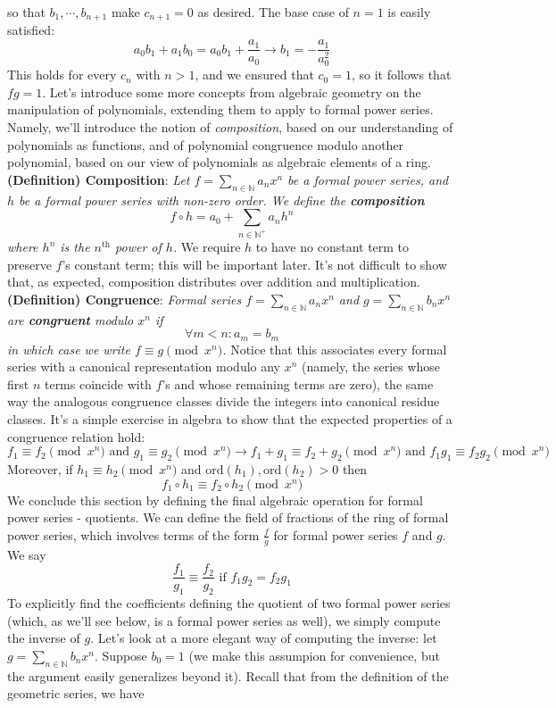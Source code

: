 \documentclass{article}
\newcommand*{\tb}{\textbf}
\newcommand*{\ti}{\textit}
\newcommand*{\nn}{\newline \newline}
\newcommand*{\N}{\mathbb{N}}
\begin{document}
so that $ b_1, \cdots, b_{n + 1} $ make $ c_{n + 1} = 0 $ as desired. The base case of $ n = 1 $ is easily satisfied:
    $$ a_0 b_1 + a_1 b_0 = a_0 b_1 + \frac{a_1}{a_0} \rightarrow b_1 = - \frac{a_1}{a_0^2} $$
This holds for every $ c_n $ with $ n > 1 $, and we ensured that $ c_0 = 1 $, so it follows that $ f g = 1 $. \qedsymbol
\nn
Let's introduce some more concepts from algebraic geometry on the manipulation of polynomials, extending them to apply to formal power series. Namely, we'll introduce the notion of \ti{composition}, based on our understanding of polynomials as functions, and of polynomial congruence modulo another polynomial, based on our view of polynomials as algebraic elements of a ring.
\nn
\tb{(Definition) Composition}: \ti{Let $ f = \sum_{n \in \N} a_n x^n $ be a formal power series, and $ h $ be a formal power series with non-zero order. We define the \tb{composition}}
    $$ f \circ h = a_0 + \sum_{n \in \N^+} a_n h^n $$
\indent \ti{where $ h^n $ is the $ n^{\text{th}} $ power of $ h $.}
\nn
We require $ h $ to have no constant term to preserve $ f $'s constant term; this will be important later. It's not difficult to show that, as expected, composition distributes over addition and multiplication.
\nn
\tb{(Definition) Congruence}: \ti{Formal series $ f = \sum_{n \in \N} a_n x^n $ and $ g = \sum_{n \in \N} b_n x^n $ are \tb{congruent} modulo $ x^n $ if}
    $$ \forall m < n: a_m = b_m $$
\indent \ti{in which case we write $ f \equiv g \pmod{x^n} $.}
\nn
Notice that this associates every formal series with a canonical representation modulo any $ x^n $ (namely, the series whose first $ n $ terms coincide with $ f $'s and whose remaining terms are zero), the same way the analogous congruence classes divide the integers into canonical residue classes. It's a simple exercise in algebra to show that the expected properties of a congruence relation hold:
    $$ f_1 \equiv f_2 \pmod{x^n} \text{ and } g_1 \equiv g_2 \pmod{x^n} \rightarrow f_1 + g_1 \equiv f_2 + g_2 \pmod{x^n} \text{ and } f_1 g_1 \equiv f_2 g_2 \pmod{x^n} $$
Moreover, if $ h_1 \equiv h_2 \pmod{x^n} $ and $ \text{ord}(h_1), \text{ord}(h_2) > 0 $ then
    $$ f_1 \circ h_1 \equiv f_2 \circ h_2 \pmod{x^n} $$
We conclude this section by defining the final algebraic operation for formal power series - quotients. We can define the field of fractions of the ring of formal power series, which involves terms of the form $ \frac{f}{g} $ for formal power series $ f $ and $ g $. We say
    $$ \frac{f_1}{g_1} \equiv \frac{f_2}{g_2} \text{ if } f_1 g_2 = f_2 g_1 $$
To explicitly find the coefficients defining the quotient of two formal power series (which, as we'll see below, is a formal power series as well), we simply compute the inverse of $ g $. Let's look at a more elegant way of computing the inverse: let $ g = \sum_{n \in \N} b_n x^n $. Suppose $ b_0 = 1 $ (we make this assumpion for convenience, but the argument easily generalizes beyond it). Recall that from the definition of the geometric series, we have
\end{document}

